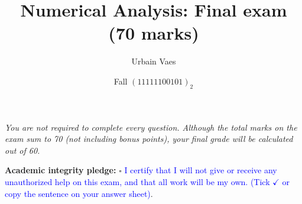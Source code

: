 \documentclass[10pt]{article}
\theoremstyle{definition}
\renewcommand{\mymarks}[1]{\textbf{#1 marks}}
\begin{document}
\title{Numerical Analysis: Final exam {\small (\mymarks{70})}}
\author{Urbain Vaes}
\date{Fall $(11111100101)_2$}
\maketitle

\noindent \emph{You are not required to complete every question.
Although the total marks on the exam sum to 70 (not including bonus points),
your final grade will be calculated out of 60.}
\vspace{.3cm}

\noindent \textbf{Academic integrity pledge:} $\square$ \textcolor{blue}{I certify that I will not give or receive any unauthorized help on this exam,
and that all work will be my own. (Tick $\checkmark$ or copy the sentence on your answer sheet)}.
\vspace{.3cm}
\end{document}
